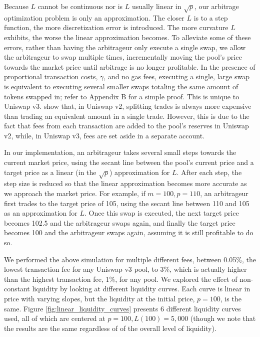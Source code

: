 \documentclass[11pt]{article}
\begin{document}
Because $L$ cannot be continuous nor is $L$ usually linear in $\sqrt{p}$, our arbitrage optimization problem is only an approximation. The closer $L$ is to a step function, the more discretization error is introduced. The more curvature $L$ exhibits, the worse the linear approximation becomes. To alleviate some of these errors, rather than having the arbitrageur only execute a single swap, we allow the arbitrageur to swap multiple times, incrementally moving the pool's price towards the market price until arbitrage is no longer profitable. In the presence of proportional transaction costs, $\gamma$, and no gas fees, executing a single, large swap is equivalent to executing several smaller swaps totaling the same amount of tokens swapped in; refer to Appendix B for a simple proof. This is unique to Uniswap v3. \citet{angeris2021analysis} show that, in Uniswap v2, splitting trades is always more expensive than trading an equivalent amount in a single trade. However, this is due to the fact that fees from each transaction are added to the pool's reserves in Uniswap v2, while, in Uniswap v3, fees are set aside in a separate account.

In our implementation, an arbitrageur takes several small steps towards the current market price, using the secant line between the pool's current price and a target price as a linear (in the $\sqrt{p}$) approximation for $L$. After each step, the step size is reduced so that the linear approximation becomes more accurate as we approach the market price. For example, if $m=100, p=110$, an arbitrageur first trades to the target price of 105, using the secant line between 110 and 105 as an approximation for $L$. Once this swap is executed, the next target price becomes 102.5 and the arbitrageur swaps again, and finally the target price becomes 100 and the arbitrageur swaps again, assuming it is still profitable to do so.

We performed the above simulation for multiple different fees, between 0.05\%, the lowest transaction fee for any Uniswap v3 pool, to 3\%, which is actually higher than the highest transaction fee, 1\%, for any pool. We explored the effect of non-constant liquidity by looking at different liquidity curves. Each curve is linear in price with varying slopes, but the liquidity at the initial price, $p=100$, is the same. Figure \ref{fig:linear_liquidity_curves} presents 6 different liquidity curves used, all of which are centered at $p=100, L(100)=5,000$ (though we note that the results are the same regardless of of the overall level of liquidity).
\end{document}
